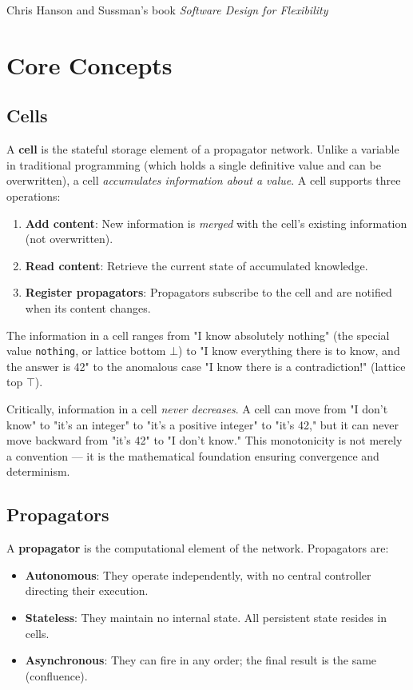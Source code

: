 \documentclass[11pt]{article}
\begin{document}
Chris Hanson and Sussman's book \emph{Software Design for Flexibility}
\section{Core Concepts}
\label{sec:org7d03620}

\subsection{Cells}
\label{sec:org56cd361}

A \textbf{cell} is the stateful storage element of a propagator network. Unlike
a variable in traditional programming (which holds a single definitive
value and can be overwritten), a cell \emph{accumulates information about a
value}. A cell supports three operations:

\begin{enumerate}
\item \textbf{Add content}: New information is \emph{merged} with the cell's existing
information (not overwritten).
\item \textbf{Read content}: Retrieve the current state of accumulated knowledge.
\item \textbf{Register propagators}: Propagators subscribe to the cell and are
notified when its content changes.
\end{enumerate}

The information in a cell ranges from "I know absolutely nothing" (the
special value \texttt{nothing}, or lattice bottom \(\bot\)) to "I know everything
there is to know, and the answer is 42" to the anomalous case "I know
there is a contradiction!" (lattice top \(\top\)).

Critically, information in a cell \emph{never decreases}. A cell can move
from "I don't know" to "it's an integer" to "it's a positive integer" to
"it's 42," but it can never move backward from "it's 42" to "I don't
know." This monotonicity is not merely a convention --- it is the
mathematical foundation ensuring convergence and determinism.
\subsection{Propagators}
\label{sec:orgc1045d1}

A \textbf{propagator} is the computational element of the network. Propagators are:

\begin{itemize}
\item \textbf{Autonomous}: They operate independently, with no central controller
directing their execution.
\item \textbf{Stateless}: They maintain no internal state. All persistent state
resides in cells.
\item \textbf{Asynchronous}: They can fire in any order; the final result is the
same (confluence).
\end{itemize}
\end{document}
